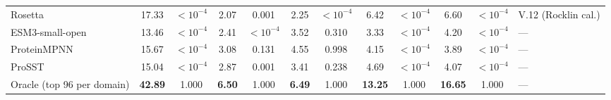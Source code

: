 \begin{table}[H]
{\begin{tabular}{lccccccccccl}
Rosetta & 17.33 & $<10^{-4}$ & 2.07 & 0.001 & 2.25 & $<10^{-4}$ & 6.42 & $<10^{-4}$ & 6.60 & $<10^{-4}$ & V.12 (Rocklin cal.) \\
ESM3-small-open & 13.46 & $<10^{-4}$ & 2.41 & $<10^{-4}$ & 3.52 & 0.310 & 3.33 & $<10^{-4}$ & 4.20 & $<10^{-4}$ & --- \\
ProteinMPNN & 15.67 & $<10^{-4}$ & 3.08 & 0.131 & 4.55 & 0.998 & 4.15 & $<10^{-4}$ & 3.89 & $<10^{-4}$ & --- \\
ProSST & 15.04 & $<10^{-4}$ & 2.87 & 0.001 & 3.41 & 0.238 & 4.69 & $<10^{-4}$ & 4.07 & $<10^{-4}$ & --- \\
Oracle (top 96 per domain) & \textbf{42.89} & 1.000 & \textbf{6.50} & 1.000 & \textbf{6.49} & 1.000 & \textbf{13.25} & 1.000 & \textbf{16.65} & 1.000 & --- \\
\bottomrule
\end{tabular}
}
\end{table}




